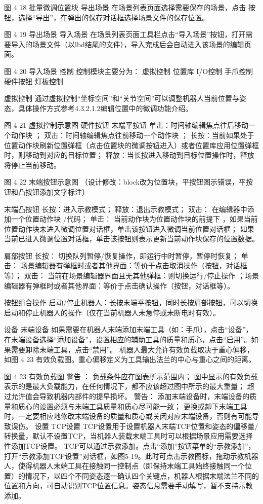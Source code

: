 图 4 18 批量微调位置块
导出场景
在场景列表页面选择需要保存的场景，点击 按钮，选择“导出”，在弹出的保存对话框选择场景文件的保存位置。


图 4 19 导出场景
导入场景
在场景列表页面工具栏点击“导入场景”按钮，打开需要导入的场景文件（以lbd结尾的文件），导入完成后会自动进入该场景的编辑页面。

图 4 20 导入场景
控制
控制模块主要分为：
虚拟控制
位置库
I/O控制
手爪控制
硬件按钮
灯板控制

虚拟控制
通过虚拟控制“坐标空间”和“关节空间”可以调整机器人当前位置与姿态，具体操作方式参考4.3.2.1.2编辑位置中的微调功能介绍。

图 4 21  虚拟控制示意图
硬件按钮
	末端平按钮
单击：时间轴编辑焦点往后移动一个动作块 ；
双击：时间轴编辑焦点往前移动一个动作块 ；
长按：当前如果处于位置动作块刷新位置弹框（点击位置块的微调按钮进入）或者位置库应用位置弹框时，则移动到对应的目标位置；
释放：当长按进入移动到目标位置操作时，释放将停止当前移动。


图 4 22  末端按钮示意图
（设计修改：block改为位置块，平按钮图示错误，平按钮和凸按钮添加文字标注）

	末端凸按钮
长按：进入示教模式；
释放：退出示教模式；
双击： 在编辑器中添加一个位置动作块 /代码；
单击： 当前动作块为位置动作块的前提下 ，如果当前位置动作块未进入微调位置对话框，单击该按钮进入微调当前位置对话框； 如果当前已进入微调位置对话框，单击该按钮则表示更新当前动作块保存的位置数据。

	肩部按钮
长按： 切换队列暂停/恢复操作，即运行中时暂停，暂停时恢复；
单击： 场景编辑器有弹框时或者其他界面：等价于点击取消操作（按钮，对话框等）；
双击： 当前在场景编辑器界面且无其他弹框：则切换运行/停止操作 ；场景编辑器有弹框时或者其他界面：等价于点击确认操作（按钮，对话框等）。

	按钮组合操作
启动/停止机器人：长按末端平按钮，同时长按肩部按钮，可以切换启动和停止机器人的操作（仅在当前机器人未急停或未断电时有效）。

设备
末端设备
如果需要在机器人末端添加末端工具（如：手爪），点击“设备”，在末端设备选择“添加设备”，设置相应的辅助工具的质量和质心，点击“启用”。如果需要卸除末端工具，点击“禁用”。
机器人最大允许有效负载取决于重心偏移，如图 4 23 有效负载图。重心偏移定义为工具输出法兰的中心与重心之间的距离。

图 4 23 有效负载图
 	警告 ：
负载条件应在图表所示范围内；
图中显示的有效负载表示的是最大负载能力，在任何情况下，都不应该超过图中所示的最大重量；
超过允许值会导致机器内部件的提早损坏。
 	警告：
添加末端设备时，末端设备的质量和质心的设置必须与末端工具质量和质心尽可能一致；
更换或卸下末端工具时，一定要相应地修改末端设备的质量和质心或关闭对应末端设备，否则有可能导致误伤。
设置
 TCP设置
TCP设置用于设置机器人末端TCP位置和姿态的偏移量/转换量，默认不设置TCP，当机器人装载末端工具时可以根据场景应用需要选择性添加TCP设置。
TCP可以通过示教添加。点击“添加”按钮菜单的“示教添加”，打开“示教添加TCP设置”对话框，如图5-19。此时可点击示教图标，拖动示教机器人，使得机器人末端工具在接触同一控制点（即保持末端工具始终接触同一个位置）的情况下，以四个不同姿态逐一确认四个关键点，机器人根据末端法兰不同的位置和方向，可自动识别TCP位置信息。姿态信息需要手动填写，暂不支持示教添加。

